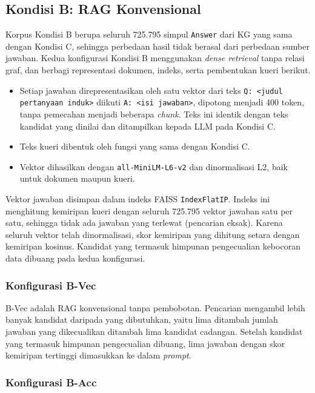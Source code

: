 \subsection{Kondisi B: RAG Konvensional}
\label{subsec:implementasi-kondisi-b}

Korpus Kondisi B berupa seluruh 725.795 simpul \texttt{Answer} dari KG yang sama dengan Kondisi C, sehingga perbedaan hasil tidak berasal dari perbedaan sumber jawaban. Kedua konfigurasi Kondisi B menggunakan \emph{dense retrieval} tanpa relasi graf, dan berbagi representasi dokumen, indeks, serta pembentukan kueri berikut.
\begin{itemize}
    \item Setiap jawaban direpresentasikan oleh satu vektor dari teks \texttt{Q: <judul pertanyaan induk>} diikuti \texttt{A: <isi jawaban>}, dipotong menjadi 400 token, tanpa pemecahan menjadi beberapa \emph{chunk}. Teks ini identik dengan teks kandidat yang dinilai dan ditampilkan kepada LLM pada Kondisi C.
    \item Teks kueri dibentuk oleh fungsi yang sama dengan Kondisi C.
    \item Vektor dihasilkan dengan \texttt{all-MiniLM-L6-v2} dan dinormalisasi L2, baik untuk dokumen maupun kueri.
\end{itemize}
Vektor jawaban disimpan dalam indeks FAISS \texttt{IndexFlatIP}. Indeks ini menghitung kemiripan kueri dengan seluruh 725.795 vektor jawaban satu per satu, sehingga tidak ada jawaban yang terlewat (pencarian eksak). Karena seluruh vektor telah dinormalisasi, skor kemiripan yang dihitung setara dengan kemiripan kosinus. Kandidat yang termasuk himpunan pengecualian kebocoran data dibuang pada kedua konfigurasi.

\subsubsection{Konfigurasi B-Vec}
\label{subsubsec:implementasi-b-vec}

B-Vec adalah RAG konvensional tanpa pembobotan. Pencarian mengambil lebih banyak kandidat daripada yang dibutuhkan, yaitu lima ditambah jumlah jawaban yang dikecualikan ditambah lima kandidat cadangan. Setelah kandidat yang termasuk himpunan pengecualian dibuang, lima jawaban dengan skor kemiripan tertinggi dimasukkan ke dalam \emph{prompt}.

\subsubsection{Konfigurasi B-Acc}
\label{subsubsec:implementasi-b-acc}

